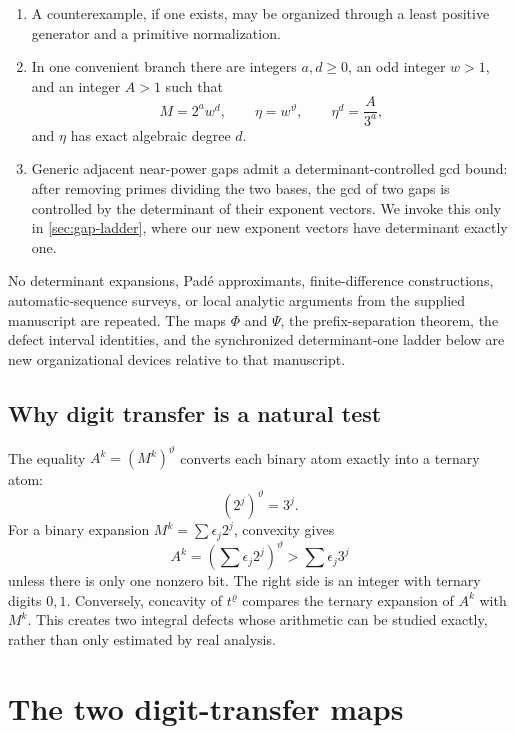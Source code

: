 \documentclass[11pt]{article}
\theoremstyle{definition}
\begin{document}
\begin{enumerate}
\item A counterexample, if one exists, may be organized through a least
positive generator and a primitive normalization.
\item In one convenient branch there are integers \(a,d\ge0\), an odd
integer \(w>1\), and an integer \(A>1\) such that
\begin{equation}\label{eq:radical-import}
  M=2^a w^d,
  \qquad \eta=w^\vartheta,
  \qquad \eta^d=\frac{A}{3^a},
\end{equation}
and \(\eta\) has exact algebraic degree \(d\).
\item Generic adjacent near-power gaps admit a determinant-controlled gcd
bound: after removing primes dividing the two bases, the gcd of two gaps is
controlled by the determinant of their exponent vectors.  We invoke this
only in \cref{sec:gap-ladder}, where our new exponent vectors have
determinant exactly one.
\end{enumerate}

No determinant expansions, Pad\'e approximants, finite-difference
constructions, automatic-sequence surveys, or local analytic arguments from
the supplied manuscript are repeated.  The maps \(\Phi\) and \(\Psi\), the
prefix-separation theorem, the defect interval identities, and the
synchronized determinant-one ladder below are new organizational devices
relative to that manuscript.

\subsection{Why digit transfer is a natural test}

The equality \(A^k=(M^k)^\vartheta\) converts each binary atom exactly into
a ternary atom:
\[
  (2^j)^\vartheta=3^j.
\]
For a binary expansion \(M^k=\sum\epsilon_j2^j\), convexity gives
\[
  A^k=\left(\sum\epsilon_j2^j\right)^\vartheta
  >\sum\epsilon_j3^j
\]
unless there is only one nonzero bit.  The right side is an integer with
ternary digits \(0,1\).  Conversely, concavity of \(t^\varrho\) compares the
ternary expansion of \(A^k\) with \(M^k\).  This creates two integral defects
whose arithmetic can be studied exactly, rather than only estimated by
real analysis.

\section{The two digit-transfer maps}
\label{sec:maps}
\end{document}
